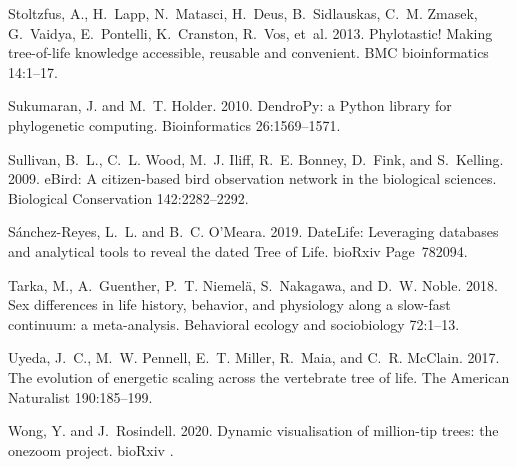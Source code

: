 \documentclass[oupdraft]{sysbio_sse}
\begin{document}
\begin{thebibliography}{49}
Stoltzfus, A., H.~Lapp, N.~Matasci, H.~Deus, B.~Sidlauskas, C.~M. Zmasek,
  G.~Vaidya, E.~Pontelli, K.~Cranston, R.~Vos, et~al. 2013. {Phylotastic!
  Making tree-of-life knowledge accessible, reusable and convenient}. BMC
  bioinformatics 14:1--17.

Sukumaran, J. and M.~T. Holder. 2010. {DendroPy}: a {Python} library for
  phylogenetic computing. Bioinformatics 26:1569--1571.

Sullivan, B.~L., C.~L. Wood, M.~J. Iliff, R.~E. Bonney, D.~Fink, and
  S.~Kelling. 2009. {eBird}: {A} citizen-based bird observation network in the
  biological sciences. Biological Conservation 142:2282--2292.

Sánchez-Reyes, L.~L. and B.~C. O’Meara. 2019. {DateLife}: {Leveraging}
  databases and analytical tools to reveal the dated {Tree} of {Life}. bioRxiv
  Page~782094.

Tarka, M., A.~Guenther, P.~T. Niemel{\"a}, S.~Nakagawa, and D.~W. Noble. 2018.
  Sex differences in life history, behavior, and physiology along a slow-fast
  continuum: a meta-analysis. Behavioral ecology and sociobiology 72:1--13.

Uyeda, J.~C., M.~W. Pennell, E.~T. Miller, R.~Maia, and C.~R. McClain. 2017.
  The evolution of energetic scaling across the vertebrate tree of life. The
  American Naturalist 190:185--199.

Wong, Y. and J.~Rosindell. 2020. Dynamic visualisation of million-tip trees:
  the onezoom project. bioRxiv .

\end{thebibliography}
\end{document}
